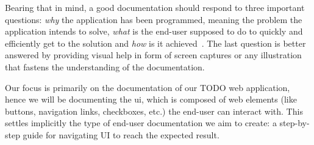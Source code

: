 Bearing that in mind, a good documentation should respond to three important questions: \textit{why} the application has been programmed, meaning the problem the application intends to solve, \textit{what} is the end-user supposed to do to quickly and efficiently get to the solution and \textit{how} is it achieved~\cite{ISO-IEC-IEEE}. The last question is better answered by providing visual help in form of screen captures or any illustration that fastens the understanding of the documentation.


Our focus is primarily on the documentation of our TODO web application, hence we will be documenting the \acrfull{ui}, which is composed of web elements (like buttons, navigation links, checkboxes, etc.) the end-user can interact with. This settles implicitly the type of end-user documentation we aim to create: a step-by-step guide for navigating UI to reach the expected result. 

